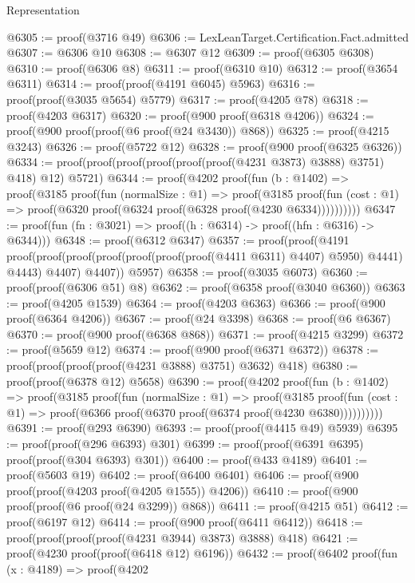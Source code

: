 \begin{lexlean}{Representation}
\begin{coremodule}
@6305 := proof(@3716 @49)
@6306 := LexLeanTarget.Certification.Fact.admitted
@6307 := @6306 @10
@6308 := @6307 @12
@6309 := proof(@6305 @6308)
@6310 := proof(@6306 @8)
@6311 := proof(@6310 @10)
@6312 := proof(@3654 @6311)
@6314 := proof(proof(@4191 @6045) @5963)
@6316 := proof(proof(@3035 @5654) @5779)
@6317 := proof(@4205 @78)
@6318 := proof(@4203 @6317)
@6320 := proof(@900 proof(@6318 @4206))
@6324 := proof(@900 proof(proof(@6 proof(@24 @3430)) @868))
@6325 := proof(@4215 @3243)
@6326 := proof(@5722 @12)
@6328 := proof(@900 proof(@6325 @6326))
@6334 := proof(proof(proof(proof(proof(proof(@4231 @3873) @3888) @3751) @418) @12) @5721)
@6344 := proof(@4202
      proof(fun (b : @1402) =>
        proof(@3185
            proof(fun (normalSize : @1) =>
              proof(@3185
                  proof(fun (cost : @1) =>
                    proof(@6320 proof(@6324 proof(@6328 proof(@4230 @6334))))))))))
@6347 := proof(fun (fn : @3021) => proof((h : @6314) -> proof((hfn : @6316) -> @6344)))
@6348 := proof(@6312 @6347)
@6357 := proof(proof(@4191
        proof(proof(proof(proof(proof(proof(proof(@4411 @6311) @4407) @5950) @4441) @4443) @4407)
            @4407))
      @5957)
@6358 := proof(@3035 @6073)
@6360 := proof(proof(@6306 @51) @8)
@6362 := proof(@6358 proof(@3040 @6360))
@6363 := proof(@4205 @1539)
@6364 := proof(@4203 @6363)
@6366 := proof(@900 proof(@6364 @4206))
@6367 := proof(@24 @3398)
@6368 := proof(@6 @6367)
@6370 := proof(@900 proof(@6368 @868))
@6371 := proof(@4215 @3299)
@6372 := proof(@5659 @12)
@6374 := proof(@900 proof(@6371 @6372))
@6378 := proof(proof(proof(proof(@4231 @3888) @3751) @3632) @418)
@6380 := proof(proof(@6378 @12) @5658)
@6390 := proof(@4202
      proof(fun (b : @1402) =>
        proof(@3185
            proof(fun (normalSize : @1) =>
              proof(@3185
                  proof(fun (cost : @1) =>
                    proof(@6366 proof(@6370 proof(@6374 proof(@4230 @6380))))))))))
@6391 := proof(@293 @6390)
@6393 := proof(proof(@4415 @49) @5939)
@6395 := proof(proof(@296 @6393) @301)
@6399 := proof(proof(@6391 @6395) proof(proof(@304 @6393) @301))
@6400 := proof(@433 @4189)
@6401 := proof(@5603 @19)
@6402 := proof(@6400 @6401)
@6406 := proof(@900 proof(proof(@4203 proof(@4205 @1555)) @4206))
@6410 := proof(@900 proof(proof(@6 proof(@24 @3299)) @868))
@6411 := proof(@4215 @51)
@6412 := proof(@6197 @12)
@6414 := proof(@900 proof(@6411 @6412))
@6418 := proof(proof(proof(proof(@4231 @3944) @3873) @3888) @418)
@6421 := proof(@4230 proof(proof(@6418 @12) @6196))
@6432 := proof(@6402
      proof(fun (x : @4189) =>
        proof(@4202

\end{coremodule}
\end{lexlean}
